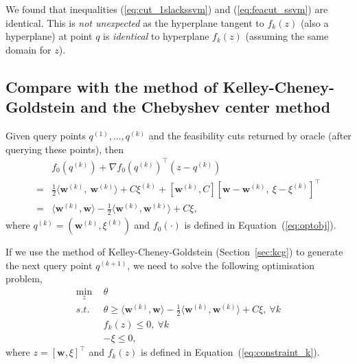 \documentclass[9pt]{extarticle}
\begin{document}
We found that inequalities (\ref{eq:cut_1slackssvm}) and (\ref{eq:feacut_ssvm}) are identical.
This is \emph{not unexpected} as the hyperplane tangent to $f_k(z)$ (also a hyperplane) at point $q$ is \emph{identical} to hyperplane $f_k(z)$
(assuming the same domain for $z$).


\subsection{Compare with the method of Kelley-Cheney-Goldstein and the Chebyshev center method}

Given query points $q^{(1)}, \dots, q^{(k)}$ and the feasibility cuts returned by oracle (after querying these points), then
\begin{equation}
\label{eq:ssvm_kcg_cons}
\begin{aligned}
 & f_0(q^{(k)}) + \nabla f_0(q^{(k)})^\top (z - q^{(k)}) \\
=& \frac{1}{2} \langle \mathbf{w}^{(k)},~ \mathbf{w}^{(k)} \rangle + C\xi^{(k)} + 
   \left[ \mathbf{w}^{(k)}, C \right] \left[ \mathbf{w} - \mathbf{w}^{(k)},~ \xi - \xi^{(k)} \right]^\top  \\
=& \langle \mathbf{w}^{(k)}, \mathbf{w} \rangle - \frac{1}{2} \langle \mathbf{w}^{(k)}, \mathbf{w}^{(k)} \rangle + C\xi,
\end{aligned}
\end{equation}
where $q^{(k)} = (\mathbf{w}^{(k)}, \xi^{(k)})$ and $f_0(\cdot)$ is defined in Equation~(\ref{eq:optobj}).

If we use the method of Kelley-Cheney-Goldstein (Section~\ref{sec:kcg}) to generate the next query point $q^{(k+1)}$,
we need to solve the following optimisation problem,
\begin{equation}
\label{eq:ssvm_kcg}
\begin{aligned}
\min_{z} ~& \theta \\
s.t.~~ ~& \theta \ge \langle \mathbf{w}^{(k)}, \mathbf{w} \rangle - \frac{1}{2} \langle \mathbf{w}^{(k)}, \mathbf{w}^{(k)} \rangle + C\xi,~ \forall k \\
        & f_k(z) \le 0,~ \forall k \\
        & -\xi \le 0,
\end{aligned}
\end{equation}
where $z = [\mathbf{w}, \xi]^\top$ and $f_k(z)$ is defined in Equation~(\ref{eq:constraint_k}).
\end{document}

